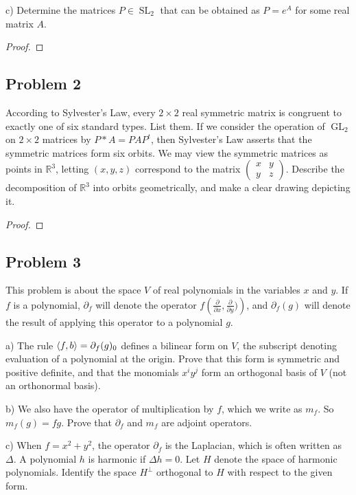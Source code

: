 \documentclass{article}
\theoremstyle{definition}
\newcommand{\R}{\mathbb{R}}
\newcommand{\GL}{\operatorname{GL}}
\newcommand{\SL}{\operatorname{SL}}
\DeclarePairedDelimiter\bilform{\langle}{\rangle}
\begin{document}
\begin{tcolorbox}
c) Determine the matrices $P \in \SL_2$ that can be obtained as $P = e^A$ for some real matrix $A$.
\end{tcolorbox}

\begin{proof}
\end{proof}

\subsection*{Problem 2}

\begin{tcolorbox}
According to Sylvester's Law, every $2 \times 2$ real symmetric matrix is congruent to exactly one of six standard types.
List them.
If we consider the operation of $\GL_2$ on $2 \times 2$ matrices by $P * A = PAP^t$, then Sylvester's Law asserts that the symmetric matrices form six orbits.
We may view the symmetric matrices as points in $\R^3$, letting $(x,y,z)$ correspond to the matrix
$
\begin{pmatrix}
    x & y \\
    y & z
\end{pmatrix}
$.
Describe the decomposition of $\R^3$ into orbits geometrically, and make a clear drawing depicting it.
\end{tcolorbox}

\begin{proof}
\end{proof}


\subsection*{Problem 3}

\begin{tcolorbox}
This problem is about the space $V$ of real polynomials in the variables $x$ and $y$.
If $f$ is a polynomial, $\partial_f$ will denote the operator 
$f \left( \frac{\partial}{\partial x}, \frac{\partial}{\partial y}) \right)$,
and $\partial_f(g)$ will denote the result of applying this operator to a polynomial $g$.

a) The rule $\bilform{f,b} = \partial_f(g)_0$ defines a bilinear form on $V$, the subscript denoting evaluation of a polynomial at the origin.
Prove that this form is symmetric and positive definite, and that the monomials $x^i y^j$ form an orthogonal basis of $V$ (not an orthonormal basis).

b) We also have the operator of multiplication by $f$, which we write as $m_f$.
So $m_f(g) = fg$.
Prove that $\partial_f$ and $m_f$ are adjoint operators.

c) When $f = x^2 + y^2$, the operator $\partial_f$ is the Laplacian, which is often written as $\Delta$.
A polynomial $h$ is harmonic if $\Delta h = 0$.
Let $H$ denote the space of harmonic polynomials.
Identify the space $H^\perp$ orthogonal to $H$ with respect to the given form.
\end{tcolorbox}
\end{document}
